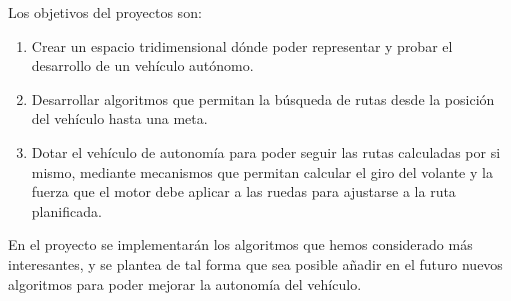 Los objetivos del proyectos son:

\begin{enumerate}
\item Crear un espacio tridimensional dónde poder representar y probar el desarrollo de un vehículo autónomo.
\item Desarrollar algoritmos que permitan la búsqueda de rutas desde la posición del vehículo hasta una meta.
\item Dotar el vehículo de autonomía para poder seguir las rutas calculadas por si mismo, mediante mecanismos que permitan calcular el giro del volante y la fuerza que el motor debe aplicar a las ruedas para ajustarse a la ruta planificada.
\end{enumerate}

En el proyecto se implementarán los algoritmos que hemos considerado más interesantes, y se plantea de tal forma que sea posible añadir en el futuro nuevos algoritmos para poder mejorar la autonomía del vehículo.
